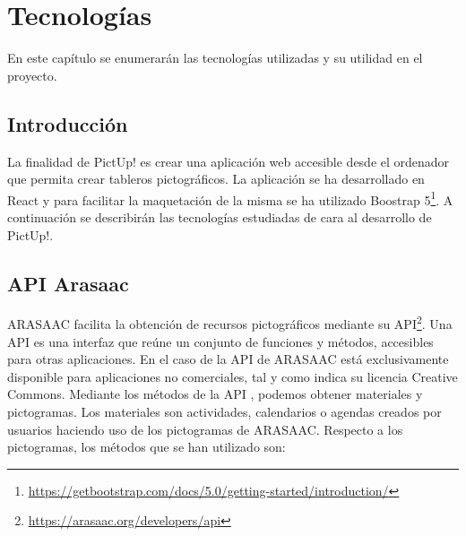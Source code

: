 \chapter{Tecnologías}
\label{cap:introduccion}


\begin{resumen}
	En este capítulo se enumerarán las tecnologías utilizadas y su utilidad en el proyecto.
\end{resumen}

\label{cap1:sec:Motivacion}


\section{Introducción}

La finalidad de PictUp! es crear una aplicación web accesible desde el ordenador que permita crear tableros pictográficos. La aplicación se ha desarrollado en React y para facilitar la maquetación de la misma se ha utilizado Boostrap 5\footnote{\url{https://getbootstrap.com/docs/5.0/getting-started/introduction/}}. 
A continuación se describirán las tecnologías estudiadas de cara al desarrollo de PictUp!.


\section{API Arasaac}
ARASAAC facilita la obtención de recursos pictográficos mediante su API\footnote{\url{https://arasaac.org/developers/api}}. Una API es una interfaz que reúne un conjunto de funciones y métodos, accesibles para otras aplicaciones. En el caso de la API de ARASAAC está exclusivamente disponible para aplicaciones no comerciales, tal y como indica su licencia Creative Commons.
Mediante los métodos de la API , podemos obtener materiales y pictogramas. Los materiales  son actividades, calendarios o agendas creados por usuarios haciendo uso de los pictogramas de ARASAAC. Respecto a los pictogramas, los métodos que se han utilizado son:

